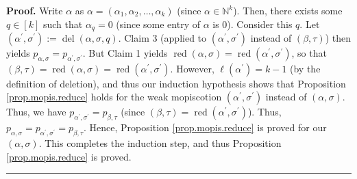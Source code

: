 \documentclass[numbers=enddot,12pt,final,onecolumn,notitlepage]{scrartcl}%
\theoremstyle{definition}
\newenvironment{fineprint}{\begin{small}}{\end{small}}
\newenvironment{proof}[1][Proof]{\noindent\textbf{#1.} }{\ \rule{0.5em}{0.5em}}
\begin{document}
\begin{fineprint}
\begin{proof}
Write $\alpha$ as $\alpha=\left(  \alpha_{1},\alpha_{2},\ldots,\alpha
_{k}\right)  $ (since $\alpha\in\mathbb{N}^{k}$). Then, there exists some
$q\in\left[  k\right]  $ such that $\alpha_{q}=0$ (since some entry of
$\alpha$ is $0$). Consider this $q$. Let $\left(  \alpha^{\prime}%
,\sigma^{\prime}\right)  :=\operatorname*{del}\left(  \alpha,\sigma,q\right)
$. Claim 3 (applied to $\left(  \alpha^{\prime},\sigma^{\prime}\right)  $
instead of $\left(  \beta,\tau\right)  $) then yields $p_{\alpha,\sigma
}=p_{\alpha^{\prime},\sigma^{\prime}}$. But Claim 1 yields
$\operatorname*{red}\left(  \alpha,\sigma\right)  =\operatorname*{red}\left(
\alpha^{\prime},\sigma^{\prime}\right)  $, so that $\left(  \beta,\tau\right)
=\operatorname*{red}\left(  \alpha,\sigma\right)  =\operatorname*{red}\left(
\alpha^{\prime},\sigma^{\prime}\right)  $. However, $\ell\left(
\alpha^{\prime}\right)  =k-1$ (by the definition of deletion), and thus our
induction hypothesis shows that Proposition \ref{prop.mopis.reduce} holds for
the weak mopiscotion $\left(  \alpha^{\prime},\sigma^{\prime}\right)  $
instead of $\left(  \alpha,\sigma\right)  $. Thus, we have $p_{\alpha^{\prime
},\sigma^{\prime}}=p_{\beta,\tau}$ (since $\left(  \beta,\tau\right)
=\operatorname*{red}\left(  \alpha^{\prime},\sigma^{\prime}\right)  $). Thus,
$p_{\alpha,\sigma}=p_{\alpha^{\prime},\sigma^{\prime}}=p_{\beta,\tau}$. Hence,
Proposition \ref{prop.mopis.reduce} is proved for our $\left(  \alpha
,\sigma\right)  $. This completes the induction step, and thus Proposition
\ref{prop.mopis.reduce} is proved.
\end{proof}
\end{fineprint}
\end{document}
